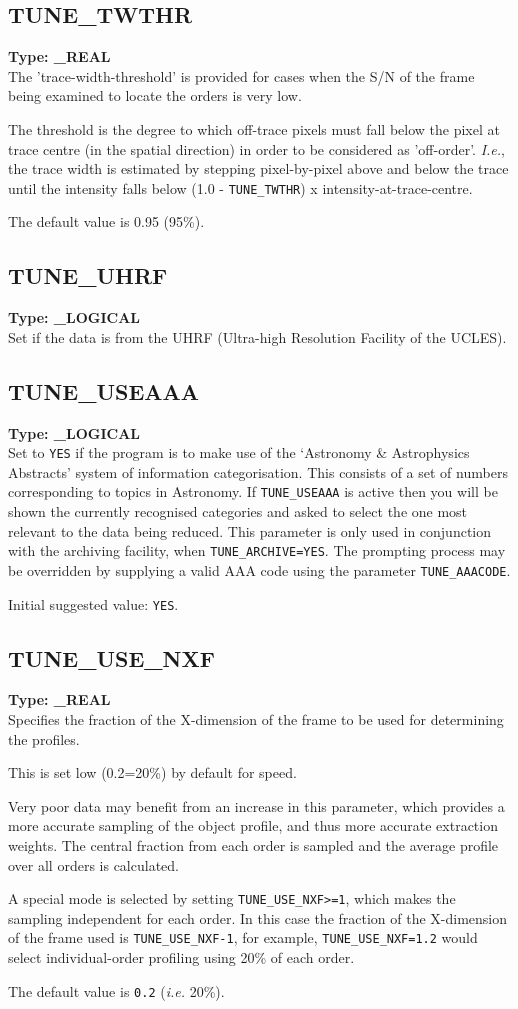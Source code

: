 \documentclass[11pt,twoside]{article}
\makeatletter
\newcommand{\xlabel}[1]{}
\newcommand{\sunspec}[2]{#1}
\renewcommand{\sunspec}[2]{#2}
\newcommand{\indexcmdname}[1]{\index{#1@\protect\cmdname{#1}}}
\renewcommand{\indexcmdname}[1]{}
\newcommand{\cmdname}{\begingroup \catcode`\_=12 \realcmdname}
\newcommand{\realcmdname}[1]{\endgroup\texttt{#1}}
\newcommand{\echparameter}[4]
{
\item [#1 = #3] \mbox{}\label{par_#2}\indexcmdname{#2}
\\
#4
}
\renewcommand{\echparameter}[4]
{
  \subsection{\xlabel{par_#2}\label{par_#2}{\bf #1}}
  {\bf Type: #3}\\
#4
}
\makeatother
\begin{document}
\echparameter{TUNE\_TWTHR}{TUNE_TWTHR}{
 \_REAL
}{
 The 'trace-width-threshold' is provided for cases when the S/N of
 the frame being examined to locate the orders is very low.

 The threshold is the degree to which off-trace pixels must fall below
 the pixel at trace centre (in the spatial direction) in order to be
 considered as 'off-order'.  {\it{I.e.}}, the trace width is estimated
 by stepping pixel-by-pixel above and below the trace until the
 intensity falls below (1.0 - {\tt TUNE\_TWTHR}) \sunspec{$\times$}{x}
 intensity-at-trace-centre.

 The default value is 0.95 (95\%).

}

\echparameter{TUNE\_UHRF}{TUNE_UHRF}{
 \_LOGICAL
}{
 Set if the data is from the UHRF (Ultra-high Resolution
 Facility of the UCLES).
}

\echparameter{TUNE\_USEAAA}{TUNE_USEAAA}{
 \_LOGICAL
}{
 Set to \texttt{YES} if the program is to make use of the `Astronomy \&
 Astrophysics Abstracts' system of information categorisation.
 This consists of a set of numbers corresponding to topics in
 Astronomy.  If {\tt TUNE\_USEAAA} is active then you will be shown
 the currently recognised categories and asked to select the one
 most relevant to the data being reduced.  This parameter is only
 used in conjunction with the archiving facility, when
 {\tt TUNE\_ARCHIVE=YES}.  The prompting process may be overridden by
 supplying a valid AAA code using the parameter {\tt TUNE\_AAACODE}.

 Initial suggested value: \texttt{YES}.
}

\echparameter{TUNE\_USE\_NXF}{TUNE_USE_NXF}{
 \_REAL
}{
 Specifies the fraction of the X-dimension of the frame to be used
 for determining the profiles.

 This is set low (0.2=20\%) by default for speed.

 Very poor data may benefit from an increase in this parameter,
 which provides a more accurate sampling of the object profile, and
 thus more accurate extraction weights.  The central
 fraction from each order is sampled and the average profile over
 all orders is calculated.

 A special mode is selected by setting {\tt TUNE\_USE\_NXF>=1},
 which makes the sampling independent for each order.  In this case
 the fraction of the X-dimension of the frame used is {\tt TUNE\_USE\_NXF-1},
 for example, {\tt TUNE\_USE\_NXF=1.2} would select individual-order
 profiling using 20\% of each order.

 The default value is \texttt{0.2} ({\it{i.e.}} 20\%).
}
\end{document}
